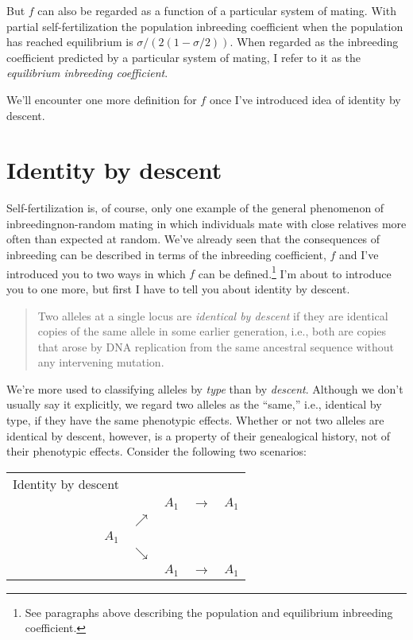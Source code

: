 \documentclass[12pt]{article}
\begin{document}
But $f$ can also be regarded as a function of a particular system of
mating. With partial self-fertilization the population inbreeding
coefficient when the population has reached equilibrium is
$\sigma/(2(1-\sigma/2))$. When regarded as the inbreeding coefficient
predicted by a particular system of mating, I refer to it as the {\it
  equilibrium inbreeding coefficient}.

We'll encounter one more definition for $f$ once I've introduced idea
of identity by descent.

\section*{Identity by descent}

Self-fertilization is, of course, only one example of the general
phenomenon of inbreeding{\dash}non-random mating in which individuals
mate with close relatives more often than expected at random. We've
already seen that the consequences of inbreeding can be described in
terms of the inbreeding coefficient, $f$ and I've introduced you to
two ways in which $f$ can be defined.\footnote{See paragraphs above
describing the population and equilibrium inbreeding coefficient.} I'm
about to introduce you to one more, but first I have to tell you about
identity by descent.

\begin{quote}
  Two alleles at a single locus are {\it identical by descent\/} if
  they are identical copies of the same allele in some earlier
  generation, i.e., both are copies that arose by DNA replication from
  the same ancestral sequence without any intervening
  mutation.
\end{quote}

We're more used to classifying alleles by {\it type\/} than by {\it
  descent}. Although we don't usually say it explicitly, we regard
two alleles as the ``same,'' i.e., identical by type,  if they have the same phenotypic effects. Whether or not
two alleles are identical by descent, however, is a property of their
genealogical history, not of their phenotypic effects. Consider the
following two scenarios:

\begin{center}
\begin{tabular}{rcccc}
Identity by descent \\
      &            & $A_1$ & $\rightarrow$ & $A_1$ \\
      & $\nearrow$ &       &               & \\
$A_1$ &            &       &               & \\
      & $\searrow$ &       &               & \\
      &            & $A_1$ & $\rightarrow$ & $A_1$ 
\end{tabular}
\end{center}
\end{document}
